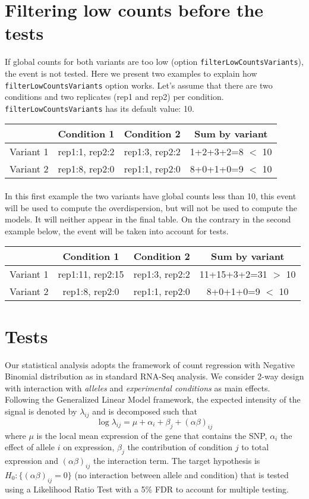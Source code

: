 \documentclass[english, a4paper, 12pt]{article}
\begin{document}
\section{Filtering low counts before the tests}
 If global counts for both variants are too low (option \texttt{filterLowCountsVariants}), the event is not tested.
Here we present two examples to explain how \texttt{filterLowCountsVariants} option works. Let's assume that there are two conditions and two replicates (rep1 and rep2) per condition. \texttt{filterLowCountsVariants} has its default value: 10.\\

\begin{tabular}{r|c|c|c}
  \hline
   & Condition 1 & Condition 2& Sum by variant \\
  \hline
  Variant 1 &	rep1:1, rep2:2 & rep1:3, rep2:2& 1+2+3+2=8 $<$ 10  \\
 Variant 2 &	rep1:8, rep2:0 & rep1:1, rep2:0& 8+0+1+0=9 $<$ 10 \\
  \hline
\end{tabular}
\paragraph{}In this first example the two variants have global counts less than 10, this event will be used to compute the overdispersion, but will not be used to compute the models. It will neither appear in the final table. On the contrary in the second example below, the event will be taken into account for tests.\\

\begin{tabular}{r|c|c|c}
  \hline
   & Condition 1 & Condition 2& Sum by variant \\
  \hline
  Variant 1 &	rep1:11, rep2:15 & rep1:3, rep2:2&  11+15+3+2=31 $>$ 10 \\
 Variant 2 &	rep1:8, rep2:0 & rep1:1, rep2:0& 8+0+1+0=9 $<$ 10 \\
  \hline
\end{tabular}


\section{Tests}
Our statistical analysis adopts the framework of count regression with Negative Binomial distribution as in standard RNA-Seq analysis. We consider 2-way design with interaction with \textit{alleles} and \textit{experimental conditions} as main effects. Following the Generalized Linear Model framework, the expected intensity of the signal is denoted by $\lambda_{ij}$ and is decomposed such that
$$
\log \lambda_{ij} = \mu + \alpha_{i} +\beta_{j} + \left(\alpha \beta \right)_{ij}
$$
where $\mu$ is the local mean expression of the gene that contains the SNP, $\alpha_{i}$ the effect of allele $i$ on expression, $\beta_{j}$ the contribution of condition $j$ to total expression and $\left(\alpha \beta \right)_{ij}$ the interaction term. The target hypothesis is $H_0:\{\left(\alpha \beta \right)_{ij}=0\}$ (no interaction between allele and condition) that is tested using a Likelihood Ratio Test with a 5\% FDR to account for multiple testing.
\end{document}

